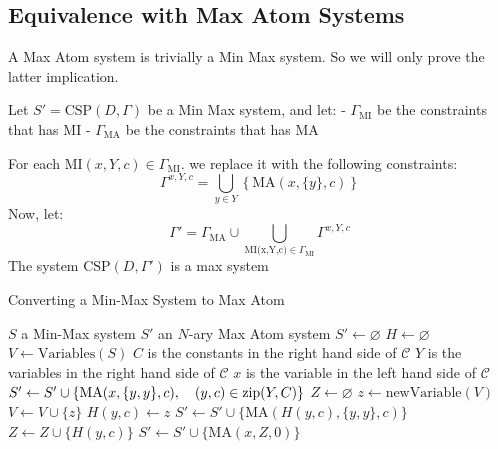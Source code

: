 \subsection{Equivalence with Max Atom Systems}
A Max Atom system is trivially a Min Max system. So we will only prove the latter implication.

Let $S'=\text{CSP}(D,\Gamma)$ be a Min Max system, and let:
- $\Gamma_{\text{MI}}$ be the constraints that has $\text{MI}$ 
- $\Gamma_{\text{MA}}$ be the constraints that has $\text{MA}$

For each $\text{MI}(x,Y,c)\in \Gamma_{\text{MI}}.$ we replace it with the following constraints:
$$
\Gamma^{x,Y,c}=\bigcup_{y\in Y}\left\{\text{MA}(x,\{y\},c)\right\}
$$
Now, let:
$$
\Gamma'=\Gamma_{\text{MA}}\cup\bigcup_{\text{MI(x,Y,c)}\in \Gamma_{\text{MI}}} \Gamma^{x,Y,c}
$$
The system $\text{CSP}(D,\Gamma')$ is a max system

\begin{algorithm}
	\caption{Converting a Min-Max System to Max Atom}\label{alg:MinMaxToMaxAtom}
	\begin{algorithmic}
		\Require $S$ a Min-Max system
		\Ensure $S'$ an $N$-ary Max Atom system  
		\State $S'\leftarrow \varnothing$
		\State $H\leftarrow\varnothing$ 
		\State $V\leftarrow \text{Variables}(S)$  
		 \State $C$ is the constants in the right hand side of $\mathcal{C}$
		 \State $Y$ is the variables in the right hand side of $\mathcal{C}$
		 \State $x$ is the variable in the left hand side of $\mathcal{C}$
			\State $S'\leftarrow S'\cup\left\{\text{MA}(x,\{y,y\},c),\quad (y,c)\in \operatorname{zip}(Y,C)\right\}$
		\Else
			\State $Z\leftarrow \varnothing$
					\State $z\leftarrow \text{newVariable}(V)$ 
					\State $V\leftarrow V\cup\{z\}$
					\State $H(y,c)\leftarrow z$
				\EndIf
				\State $S'\leftarrow S'\cup\{\text{MA}(H(y,c),\{y,y\},c)\}$
				\State $Z\leftarrow Z\cup \{H(y,c)\} $
			\EndFor
			\State $S' \leftarrow S' \cup \{\text{MA}(x,Z,0)\}$
		\EndIf
		\EndFor
	\end{algorithmic}
\end{algorithm}


